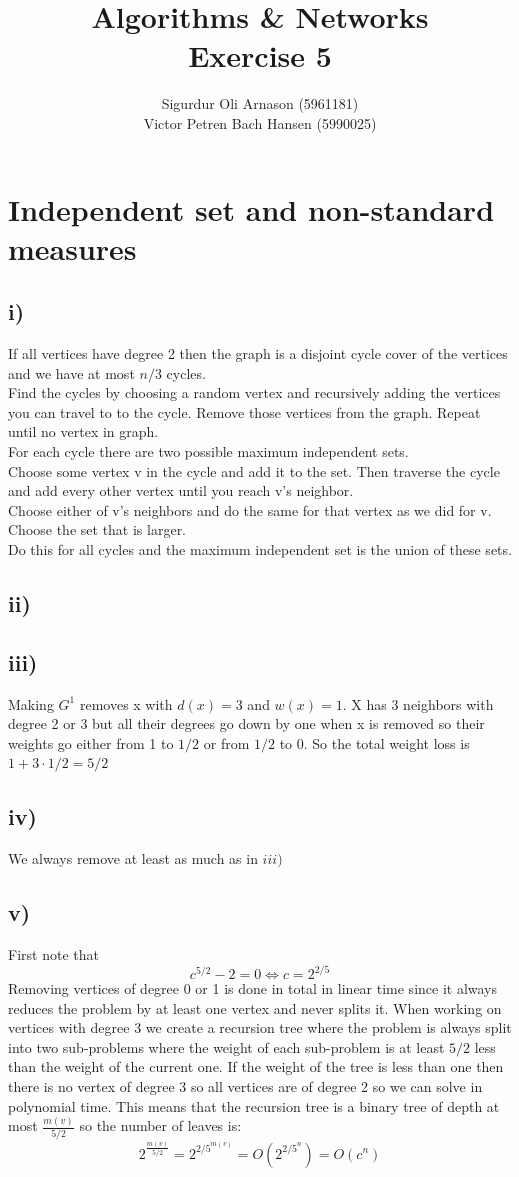 \documentclass[a4paper]{article}
\author{Sigurdur Oli Arnason (5961181) \\ Victor Petren Bach Hansen (5990025)}
\title{Algorithms \& Networks \\ Exercise 5}
\begin{document}
\maketitle
\section{Independent set and non-standard measures}
\subsection*{i)}
If all vertices have degree 2 then the graph is a disjoint cycle cover of the vertices and we have at most $n/3$ cycles.\\
Find the cycles by choosing a random vertex and recursively adding the vertices you can travel to to the cycle. Remove those vertices from the graph. Repeat until no vertex in graph.\\
For each cycle there are two possible maximum independent sets.\\
\indent Choose some vertex v in the cycle and add it to the set. Then traverse the cycle and add every other vertex until you reach v's neighbor.\\
\indent Choose either of v's neighbors and do the same for that vertex as we did for v.\\
\indent Choose the set that is larger.\\
Do this for all cycles and the maximum independent set is the union of these sets.
\subsection*{ii)}
\subsection*{iii)}
Making $G^1$ removes x with $d(x)=3$ and $w(x)=1$. X has 3 neighbors with degree 2 or 3 but all their degrees go down by one when x is removed so their weights go either from 1 to $1/2$ or from $1/2$ to 0. So the total weight loss is $1+3\cdot 1/2=5/2$
\subsection*{iv)}
We always remove at least as much as in $iii)$
\subsection*{v)}
First note that
\[
c^{5/2}-2=0 \iff c=2^{2/5}
\]
Removing vertices of degree 0 or 1 is done in total in linear time since it always reduces the problem by at least one vertex and never splits it. When working on vertices with degree 3 we create a recursion tree where the problem is always split into two sub-problems where the weight of each sub-problem is at least $5/2$ less than the weight of the current one. If the weight of the tree is less than one then there is no vertex of degree 3 so all vertices are of degree 2 so we can solve in polynomial time. This means that the recursion tree is a binary tree of depth at most $\frac{m(v)}{5/2}$ so the number of leaves is:
\[
2^{\frac{m(v)}{5/2}}=2^{2/5^{m(v)}}=O(2^{2/5^n})=O(c^n)
\]
\end{document}
